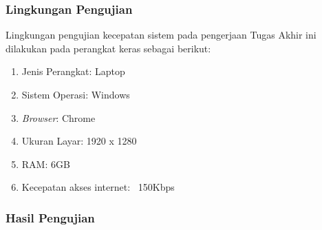
	\subsubsection{Lingkungan Pengujian}
	Lingkungan pengujian kecepatan sistem pada pengerjaan Tugas Akhir ini dilakukan pada perangkat keras sebagai berikut: 
		\begin{enumerate}[label=\alph*.]
			\item Jenis Perangkat: Laptop
			\item Sistem Operasi: Windows
			\item \textit{Browser}: Chrome
			\item Ukuran Layar: 1920 x 1280
			\item RAM: 6GB
			\item Kecepatan akses internet: ~150Kbps
		\end{enumerate}
	
	\subsubsection{Hasil Pengujian}
